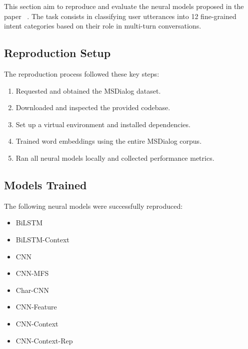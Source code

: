 \documentclass{article}
\begin{document}
This section aim to reproduce and evaluate the neural models proposed in the paper ~\cite{qu2019user}. The task consists in classifying user utterances into 12 fine-grained intent categories based on their role in multi-turn conversations.

\subsection{Reproduction Setup}

The reproduction process followed these key steps:

\begin{enumerate}
    \item Requested and obtained the MSDialog dataset.
    \item Downloaded and inspected the provided codebase.
    \item Set up a virtual environment and installed dependencies.
    \item Trained word embeddings using the entire MSDialog corpus.
    \item Ran all neural models locally and collected performance metrics.
\end{enumerate}

\subsection{Models Trained}

The following neural models were successfully reproduced:

\begin{itemize}
    \item BiLSTM
    \item BiLSTM-Context
    \item CNN
    \item CNN-MFS
    \item Char-CNN
    \item CNN-Feature
    \item CNN-Context
    \item CNN-Context-Rep
\end{itemize}
\end{document}
